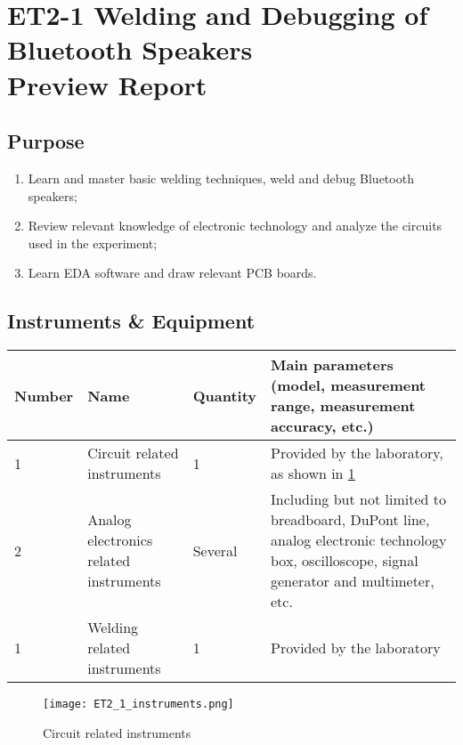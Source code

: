 
\setcounter{section}{0}
\section{ET2-1 Welding and Debugging of Bluetooth Speakers \\ Preview Report}


\subsection{Purpose}
\begin{enumerate}
	\item Learn and master basic welding techniques, weld and debug Bluetooth speakers;
	\item Review relevant knowledge of electronic technology and analyze the circuits used in the experiment;
	\item Learn EDA software and draw relevant PCB boards.
\end{enumerate}


\subsection{Instruments \& Equipment}
\begin{table}[htbp]
	\centering
	\renewcommand\arraystretch{1.6}
	\begin{tabular}{|p{}|p{}|p{}|p{}|}
		\hline
		Number & Name & Quantity & Main parameters (model, measurement range, measurement accuracy, etc.) \\
		\hline
		1 & Circuit related instruments & 1 & Provided by the laboratory, as shown in \cref{fig:instruments} \\
		\hline
		2 & Analog electronics related instruments & Several & Including but not limited to breadboard, DuPont line, analog electronic technology box, oscilloscope, signal generator and multimeter, etc. \\
		\hline
		1 & Welding related instruments & 1 & Provided by the laboratory \\
		\hline
	\end{tabular}
\end{table}

\begin{figure}[htbp]
	\centering
	\texttt{[image: ET2\_1\_instruments.png]}
	\caption{Circuit related instruments}
	\label{fig:instruments}
\end{figure}


